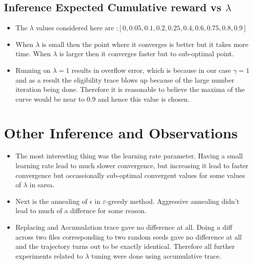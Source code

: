 \documentclass{article}
\begin{document}
\subsection{Inference Expected Cumulative reward vs $\lambda$}
\begin{itemize}
\item The $\lambda$ values considered here are :$ [0, 0.05, 0.1, 0.2, 0.25, 0.4, 0.6, 0.75, 0.8, 0.9]$
\item When $\lambda$ is small then the point where it converges is better but it takes more time. When $\lambda$ is larger then it converges faster but to sub-optimal point.
\item Running on $\lambda=1$ results in overflow error, which is because in our case $\gamma=1$ and as a result the eligibility trace blows up because of the large number iteration being done. Therefore it is reasonable to believe the maxima of the curve would be near to $0.9$ and hence this value is chosen.
\end{itemize}

\section{Other Inference and Observations}
\begin{itemize}
\item The most interesting thing was the learning rate parameter. Having a small learning rate lead to much slower convergence, but increasing it lead to faster convergence but occassionally sub-optimal convergent values for some values of $\lambda$ in sarsa.
\item Next is the annealing of $\epsilon$ in $\varepsilon$-greedy method. Aggressive annealing didn't lead to much of a differnce for some reason.
\item Replacing and Accumulation trace gave no difference at all. Doing a diff across two files corresponding to two random seeds gave no difference at all and the trajectory turns out to be exactly identical. Therefore all further experiments related to $\lambda$ tuning were done using accumulative trace.
\end{itemize}
\end{document}
